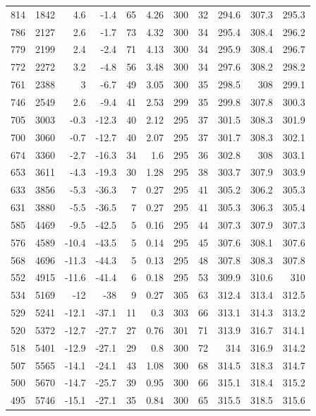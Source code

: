 \documentclass{article}
\begin{document}
\begin{longtable}{r|r|r|r|r|r|r|r|r|r|r}
814 & 1842 & 4.6 & -1.4 & 65 & 4.26 & 300 & 32 & 294.6 & 307.3 & 295.3 \\
786 & 2127 & 2.6 & -1.7 & 73 & 4.32 & 300 & 34 & 295.4 & 308.4 & 296.2 \\
779 & 2199 & 2.4 & -2.4 & 71 & 4.13 & 300 & 34 & 295.9 & 308.4 & 296.7 \\
772 & 2272 & 3.2 & -4.8 & 56 & 3.48 & 300 & 34 & 297.6 & 308.2 & 298.2 \\
761 & 2388 & 3 & -6.7 & 49 & 3.05 & 300 & 35 & 298.5 & 308 & 299.1 \\
746 & 2549 & 2.6 & -9.4 & 41 & 2.53 & 299 & 35 & 299.8 & 307.8 & 300.3 \\
705 & 3003 & -0.3 & -12.3 & 40 & 2.12 & 295 & 37 & 301.5 & 308.3 & 301.9 \\
700 & 3060 & -0.7 & -12.7 & 40 & 2.07 & 295 & 37 & 301.7 & 308.3 & 302.1 \\
674 & 3360 & -2.7 & -16.3 & 34 & 1.6 & 295 & 36 & 302.8 & 308 & 303.1 \\
653 & 3611 & -4.3 & -19.3 & 30 & 1.28 & 295 & 38 & 303.7 & 307.9 & 303.9 \\
633 & 3856 & -5.3 & -36.3 & 7 & 0.27 & 295 & 41 & 305.2 & 306.2 & 305.3 \\
631 & 3880 & -5.5 & -36.5 & 7 & 0.27 & 295 & 41 & 305.3 & 306.3 & 305.4 \\
585 & 4469 & -9.5 & -42.5 & 5 & 0.16 & 295 & 44 & 307.3 & 307.9 & 307.3 \\
576 & 4589 & -10.4 & -43.5 & 5 & 0.14 & 295 & 45 & 307.6 & 308.1 & 307.6 \\
568 & 4696 & -11.3 & -44.3 & 5 & 0.13 & 295 & 48 & 307.8 & 308.3 & 307.8 \\
552 & 4915 & -11.6 & -41.4 & 6 & 0.18 & 295 & 53 & 309.9 & 310.6 & 310 \\
534 & 5169 & -12 & -38 & 9 & 0.27 & 305 & 63 & 312.4 & 313.4 & 312.5 \\
529 & 5241 & -12.1 & -37.1 & 11 & 0.3 & 303 & 66 & 313.1 & 314.3 & 313.2 \\
520 & 5372 & -12.7 & -27.7 & 27 & 0.76 & 301 & 71 & 313.9 & 316.7 & 314.1 \\
518 & 5401 & -12.9 & -27.1 & 29 & 0.8 & 300 & 72 & 314 & 316.9 & 314.2 \\
507 & 5565 & -14.1 & -24.1 & 43 & 1.08 & 300 & 68 & 314.5 & 318.3 & 314.7 \\
500 & 5670 & -14.7 & -25.7 & 39 & 0.95 & 300 & 66 & 315.1 & 318.4 & 315.2 \\
495 & 5746 & -15.1 & -27.1 & 35 & 0.84 & 300 & 65 & 315.5 & 318.5 & 315.6 \\

\end{longtable}
\end{document}
